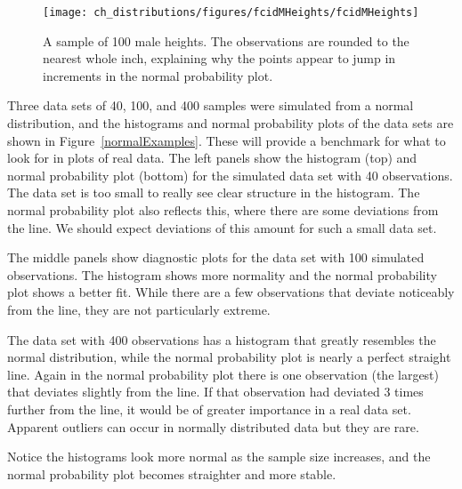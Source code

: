 \begin{figure}[h]
\centering
\texttt{[image: ch\_distributions/figures/fcidMHeights/fcidMHeights]}
\caption{A sample of 100 male heights. The observations are rounded to the nearest whole inch, explaining why the points appear to jump in increments in the normal probability plot.}
\label{fcidMHeights}
\end{figure}

\begin{examplewrap}
\begin{nexample}{Three data sets of 40, 100, and 400
    samples were simulated from a normal distribution,
    and the histograms and normal probability plots
    of the data sets are shown in Figure~\ref{normalExamples}.
    These will provide a benchmark for what to look for
    in plots of real data.}
  \label{normalExamplesExample}%
  The left panels show the histogram (top) and normal
  probability plot (bottom) for the simulated data set
  with 40 observations.
  The data set is too small to really see clear structure
  in the histogram.
  The normal probability plot also reflects this,
  where there are some deviations from the line.
  We should expect deviations of this amount for
  such a small data set.

  The middle panels show diagnostic plots for the
  data set with 100 simulated observations.
  The histogram shows more normality and the normal
  probability plot shows a better fit.
  While there are a few observations that deviate
  noticeably from the line, they are not particularly
  extreme.

  The data set with 400 observations has a histogram
  that greatly resembles the normal distribution,
  while the normal probability plot is nearly a perfect
  straight line.
  Again in the normal probability plot there is one
  observation (the largest) that deviates slightly from
  the line.
  If that observation had deviated 3 times further from
  the line, it would be of greater importance in a real
  data set.
  Apparent outliers can occur in normally distributed
  data but they are rare.

  Notice the histograms look more normal as the sample
  size increases, and the normal probability plot becomes
  straighter and more stable.
\end{nexample}
\end{examplewrap}

